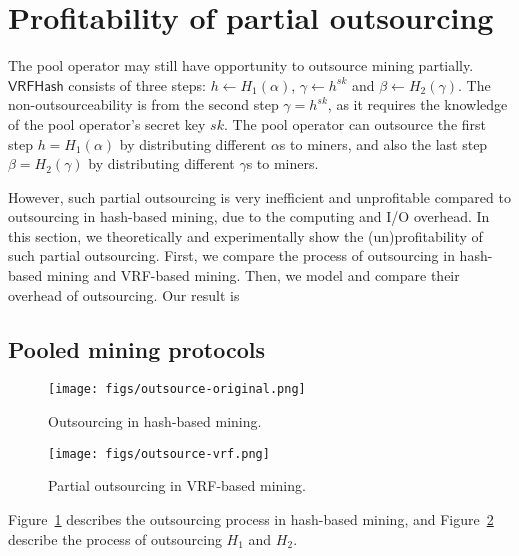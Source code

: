 \section{Profitability of partial outsourcing}
\label{sec:partial-outsourcing}

The pool operator may still have opportunity to outsource mining partially.
$\mathsf{VRFHash}$ consists of three steps: $h \gets H_1(\alpha)$, $\gamma \gets h^{sk}$ and $\beta \gets H_2(\gamma)$.
The non-outsourceability is from the second step $\gamma = h^{sk}$, as it requires the knowledge of the pool operator's secret key $sk$.
The pool operator can outsource the first step $h = H_1(\alpha)$ by distributing different $\alpha$s to miners, and also the last step $\beta = H_2(\gamma)$ by distributing different $\gamma$s to miners.

However, such partial outsourcing is very inefficient and unprofitable compared to outsourcing in hash-based mining, due to the computing and I/O overhead.
In this section, we theoretically and experimentally show the (un)profitability of such partial outsourcing.
First, we compare the process of outsourcing in hash-based mining and VRF-based mining.
Then, we model and compare their overhead of outsourcing.
Our result is 

\subsection{Pooled mining protocols}

\begin{figure}[htp]
    \centering
    \texttt{[image: figs/outsource-original.png]}
    \caption{Outsourcing in hash-based mining.}
    \label{fig:outsource-original}
\end{figure}
\begin{figure}[htp]
    \centering
    \texttt{[image: figs/outsource-vrf.png]}
    \caption{Partial outsourcing in VRF-based mining.}
    \label{fig:outsource-vrf}
\end{figure}

Figure~\ref{fig:outsource-original} describes the outsourcing process in hash-based mining, and Figure~\ref{fig:outsource-vrf} describe the process of outsourcing $H_1$ and $H_2$.

